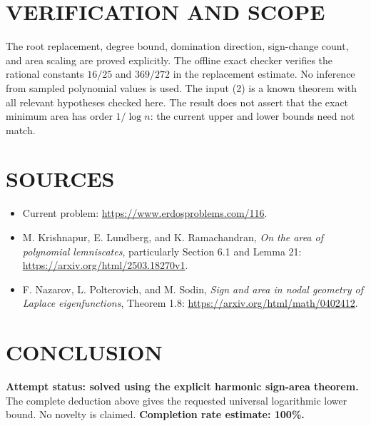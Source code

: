\section{VERIFICATION AND SCOPE}
The root replacement, degree bound, domination direction, sign-change count, and area scaling are proved explicitly. The offline exact checker verifies the rational constants $16/25$ and $369/272$ in the replacement estimate. No inference from sampled polynomial values is used. The input (2) is a known theorem with all relevant hypotheses checked here. The result does not assert that the exact minimum area has order $1/\log n$: the current upper and lower bounds need not match.

\section{SOURCES}
\begin{itemize}
\item Current problem: \url{https://www.erdosproblems.com/116}.
\item M. Krishnapur, E. Lundberg, and K. Ramachandran, \emph{On the area of polynomial lemniscates}, particularly Section 6.1 and Lemma 21: \url{https://arxiv.org/html/2503.18270v1}.
\item F. Nazarov, L. Polterovich, and M. Sodin, \emph{Sign and area in nodal geometry of Laplace eigenfunctions}, Theorem 1.8: \url{https://arxiv.org/html/math/0402412}.
\end{itemize}

\section{CONCLUSION}
\textbf{Attempt status: solved using the explicit harmonic sign-area theorem.} The complete deduction above gives the requested universal logarithmic lower bound. No novelty is claimed.
\textbf{Completion rate estimate: 100\%.}
